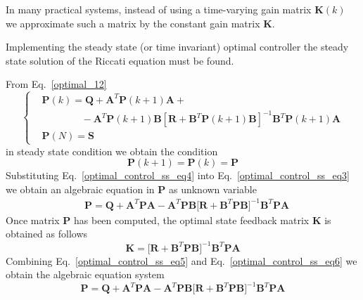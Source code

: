 \documentclass[11pt,a4paper,oneside]{book}
\numberwithin{equation}{section}
\theoremstyle{it}
\theoremstyle{definition}
\begin{document}
In many practical systems, instead of using a time-varying gain matrix 
$\mathbf{K}(k)$ we approximate such a matrix by the constant gain matrix 
$\mathbf{K}$.

Implementing the steady state (or time invariant) optimal controller the steady 
state solution of the Riccati equation must be found.   

From Eq.~\eqref{optimal_12}
\begin{equation}\label{optimal_control_ss_eq3}
	\left\lbrace \begin{aligned}
		&\mathbf{P}(k) =\mathbf{Q}+\mathbf{A}^T\mathbf{P}(k+1)\mathbf{A}+ 
		\\[6pt]
		& \qquad\qquad -\mathbf{A}^T\mathbf{P}(k+1)\mathbf{B}\left[ 
		\mathbf{R}+\mathbf{B}^T\mathbf{P}(k+1)\mathbf{B}\right]^{-1}\mathbf{B}^T\mathbf{P}(k+1)
		\mathbf{A} \\[6pt]
		&\mathbf{P}(N) =\mathbf{S}
	\end{aligned}\right. 
\end{equation}
in steady state condition we obtain the condition
\begin{equation}\label{optimal_control_ss_eq4}
	\mathbf{P}(k+1) = \mathbf{P}(k) = \mathbf{P}
\end{equation}
Substituting Eq.~\eqref{optimal_control_ss_eq4} into Eq.~\eqref{optimal_control_ss_eq3} we obtain an algebraic equation in $\mathbf{P}$ as unknown variable
\begin{equation}\label{optimal_control_ss_eq5}
	\begin{aligned}
		&\mathbf{P} =\mathbf{Q}+\mathbf{A}^T\mathbf{P}\mathbf{A} 
		-\mathbf{A}^T\mathbf{P}\mathbf{B}\Big[
		\mathbf{R}+\mathbf{B}^T\mathbf{P}\mathbf{B}\Big]^{-1}\mathbf{B}^T 		
		\mathbf{P}\mathbf{A}
	\end{aligned}
\end{equation}
Once matrix $\mathbf{P}$ has been computed, the optimal state feedback matrix $\mathbf{K}$ is obtained as follows
\begin{equation}\label{optimal_control_ss_eq6}
	\mathbf{K} = \Big[
	\mathbf{R}+\mathbf{B}^T\mathbf{P}\mathbf{B}\Big]^{-1}\mathbf{B}^T\mathbf{P}
	\mathbf{A}
\end{equation}
Combining Eq.~\eqref{optimal_control_ss_eq5} and 
Eq.~\eqref{optimal_control_ss_eq6} we obtain the algebraic equation system
\begin{equation}\label{optimal_control_ss_eq7}
	\mathbf{P} =\mathbf{Q}+\mathbf{A}^T\mathbf{P}\mathbf{A} 
	-\mathbf{A}^T\mathbf{P}\mathbf{B}\Big[
	\mathbf{R}+\mathbf{B}^T\mathbf{P}\mathbf{B}\Big]^{-1} \mathbf{B}^T 	
	\mathbf{P}\mathbf{A} 
\end{equation}
\end{document}
